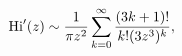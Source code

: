 \[\mathop{\mathrm{Hi}\/}\nolimits'\!\left(z\right)\sim\frac{1}{\pi z^{2}}\sum_{k%
=0}^{\infty}\frac{(3k+1)!}{k!(3z^{3})^{k}},\]